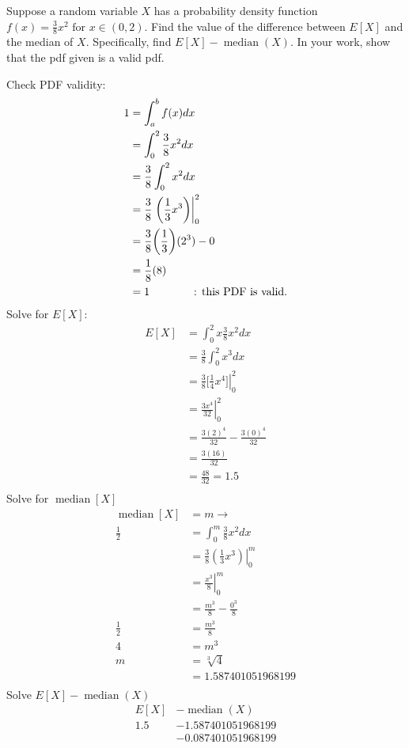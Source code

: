 \documentclass[answers]{exam}
\begin{document}
\begin{questions}
\question 
Suppose a random variable \(X\)
has a probability density function 
\(f(x) = \frac{3}{8} x^2 \text{ for } x \in(0,2)\). 
Find the value of the difference between 
\(E[X]\) and the median of \(X\). 
Specifically, find \(E[X] − \operatorname{median}(X)\). 
In your work, show that the pdf given is a valid pdf.
\begin{solution}
	Check PDF validity:
	\begin{align*}
		1
		&= \int_{a}^{b} f(x) dx \\
		&= \int_{0}^{2} \frac{3}{8}x^2 dx \\
		&= \frac{3}{8} \int_{0}^{2} x^2 dx \\
		&= \frac{3}{8} \left. \bigg(\frac{1}{3}x^3\bigg) \right|_{0}^{2} \\
		&= \frac{3}{8} \bigg(\frac{1}{3}\bigg)(2^3) - 0 \\
		&= \frac{1}{8} (8) \\
		&= 1 \text{\hspace{4em}: this PDF is valid.}
	\end{align*}
	Solve for \(E[X]\):
	\begin{align*}
		E[X] 
		&= \int_{0}^{2} x \frac{3}{8}x^2 dx \\
		&= \frac{3}{8} \int_{0}^{2} x^3 dx \\
		&= \frac{3}{8} \left. \bigg[\frac{1}{4}x^4\bigg] \right|_0^2 \\
		&= \left. \frac{3x^4}{32} \right|_0^2 \\
		&= \frac{3(2)^4}{32} - \frac{3(0)^4}{32} \\
		&= \frac{3(16)}{32} \\
		&= \frac{48}{32} = 1.5 \\
	\end{align*}
	Solve for \(\operatorname{median}[X]\)
	\begin{align*}
		\operatorname{median}[X] &= m \rightarrow \\
		\frac{1}{2} &= \int_{0}^{m}\frac{3}{8}x^2dx \\
		&= \left. \frac{3}{8}(\frac{1}{3}x^3) \right|_{0}^{m} \\
		&= \left. \frac{x^3}{8} \right|_{0}^{m} \\
		&= \frac{m^3}{8} - \frac{0^3}{8} \\
		\frac{1}{2} &= \frac{m^3}{8} \\
		4 &= m^3 \\
		m &= \sqrt[3]{4} \\
		&= 1.587401051968199 \\
	\end{align*}
	Solve \(E[X] − \operatorname{median}(X)\)
	\begin{align*}
		E[X] &− \operatorname{median}(X) \\
		1.5 &- 1.587401051968199 \\
		&-0.087401051968199
	\end{align*}
\end{solution}

\end{questions}
\end{document}
